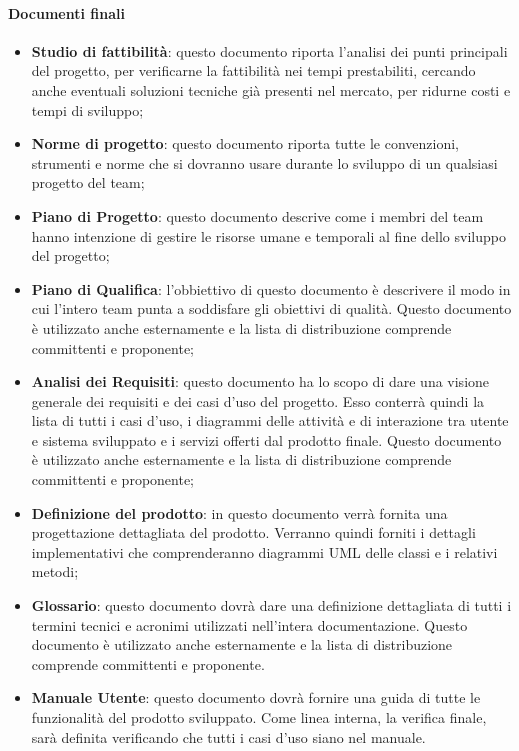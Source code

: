 \documentclass[../NormeDiProgetto_v4.0.0.tex]{subfiles}
\begin{document}
			\paragraph{Documenti finali}
				\begin{itemize}
				\item \textbf{Studio di fattibilità}: questo documento riporta l'analisi dei punti principali del progetto, per verificarne la fattibilità nei tempi prestabiliti, cercando anche eventuali soluzioni tecniche già presenti nel mercato, per ridurne costi e tempi di sviluppo;
				\item \textbf{Norme di progetto}: questo documento riporta tutte le convenzioni, strumenti e norme che si dovranno usare durante lo sviluppo di un qualsiasi progetto del team;
				\item \textbf{Piano di Progetto}: questo documento descrive come i membri del team hanno intenzione di gestire le risorse umane e temporali al fine dello sviluppo del progetto;
				\item \textbf{Piano di Qualifica}: l'obbiettivo di questo documento è descrivere il modo in cui l'intero team punta a soddisfare gli obiettivi di qualità. Questo documento è utilizzato anche esternamente e la lista di distribuzione
				comprende committenti e proponente;
				\item \textbf{Analisi dei Requisiti}: questo documento ha lo scopo di dare una visione generale dei requisiti e dei casi d'uso del progetto.
				Esso conterrà quindi la lista di tutti i casi d'uso, i diagrammi delle attività e di interazione tra utente e sistema sviluppato e i servizi offerti dal prodotto finale. Questo documento è utilizzato anche esternamente e la lista di distribuzione comprende committenti e proponente;
				\item \textbf{Definizione del prodotto}: in questo documento verrà fornita una progettazione dettagliata del prodotto. Verranno quindi forniti i dettagli implementativi che comprenderanno diagrammi UML delle classi e i relativi metodi;
				\item \textbf{Glossario}: questo documento dovrà dare una definizione dettagliata di tutti i termini tecnici e acronimi utilizzati nell'intera documentazione. Questo documento è utilizzato anche esternamente e la lista di distribuzione comprende committenti e proponente.
				\item \textbf{Manuale Utente}: questo documento dovrà fornire una guida di tutte le funzionalità del prodotto sviluppato.
				Come linea interna, la verifica finale, sarà definita verificando che tutti i casi d'uso siano nel manuale.

\end{itemize}
\end{document}
